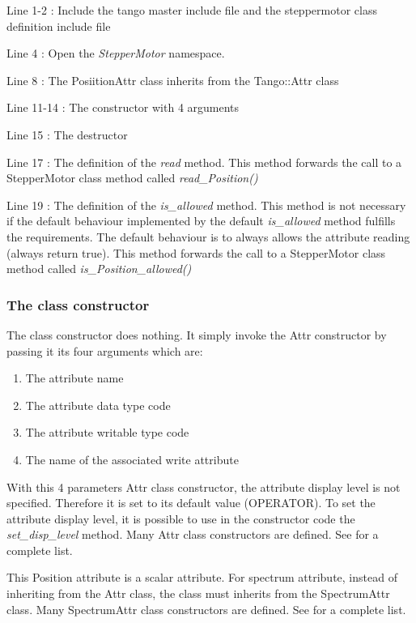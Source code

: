 

Line 1-2 : Include the tango master include file and the steppermotor
class definition include file

Line 4 : Open the \emph{StepperMotor} namespace.

Line 8 : The PosiitionAttr class inherits from the Tango::Attr class

Line 11-14 : The constructor with 4 arguments

Line 15 : The destructor

Line 17 : The definition of the \emph{read} method. This method forwards
the call to a StepperMotor class method called \emph{read\_Position()}

Line 19 : The definition of the \emph{is\_allowed}
method. This method is not necessary if the default behaviour implemented
by the default \emph{is\_allowed} method fulfills the requirements.
The default behaviour is to always allows the attribute reading (always
return true). This method forwards the call to a StepperMotor class
method called \emph{is\_Position\_allowed()}

\subsubsection{The class constructor}

The class constructor does nothing. It simply invoke the Attr
constructor by passing it its four arguments which are:
\begin{enumerate}
\item The attribute name
\item The attribute data type code
\item The attribute writable type code
\item The name of the associated write attribute
\end{enumerate}
With this 4 parameters Attr class constructor, the attribute display
level is not specified. Therefore it is set to its default value (OPERATOR).
To set the attribute display level, it is possible to use in the constructor
code the \emph{set\_disp\_level} method. Many
Attr class constructors are defined. See \cite{TANGO_ref_man}for
a complete list.

This Position attribute is a scalar attribute. For spectrum attribute,
instead of inheriting from the Attr class, the class must inherits
from the SpectrumAttr class. Many SpectrumAttr
class constructors are defined. See \cite{TANGO_ref_man}for a complete
list.

